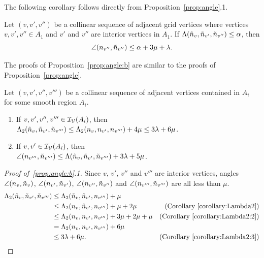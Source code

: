 The following corollary follows directly from Proposition~\ref{prop:angle}.1.
\begin{corollary}
Let $(v,v',v'')$ be a collinear sequence of adjacent grid vertices
where vertices $v,v',v'' \in A_1$
and $v'$ and $v''$ are interior vertices in $A_1$.
If $\Lambda(\tilde{n}_v,\tilde{n}_{v'},\tilde{n}_{v''}) \le \alpha$, then
\begin{equation*}
\angle(n_{v''},\tilde{n}_{v''}) \le \alpha + 3 \mu + \lambda.
\end{equation*}
\label{corollary:collinear}
\end{corollary}

The proofs of Proposition~\ref{prop:angle:b} are similar
to the proofs of Proposition~\ref{prop:angle}.

\begin{propAngle:b}
Let $(v, v', v'',v''')$ be a collinear sequence of adjacent vertices
contained in $A_i$ for some smooth region $A_i$.
\begin{enumerate}
\item If $v, v', v'', v''' \in \mathcal{I_V}(A_i)$, then\\
{\centering
$\Lambda_2(\tilde{n}_v, \tilde{n}_{v'}, \tilde{n}_{v'''}) \le 
\Lambda_2(n_v, n_{v'}, n_{v'''}) + 4 \mu \le 3\lambda + 6 \mu$.}
\item If $v, v' \in \mathcal{I_V}(A_i)$, then\\
{\centering
$\angle(n_{v'''},\tilde{n}_{v'''}) 
   \le \Lambda(\tilde{n}_v,\tilde{n}_{v'},\tilde{n}_{v'''}) + 3\lambda+ 5 \mu$.}
\end{enumerate}
\end{propAngle:b}

\begin{proof}[Proof of~\ref{prop:angle:b}.1]

Since $v$, $v'$, $v''$ and $v'''$ are interior vertices,
angles $\angle(n_v,\tilde{n}_v)$, $\angle(n_{v'}, \tilde{n}_{v'})$,
$\angle(n_{v''}, \tilde{n}_{v''})$ and $\angle(n_{v'''},\tilde{n}_{v'''})$
are all less than $\mu$.
\begin{align*}
\Lambda_2(\tilde{n}_v,\tilde{n}_{v'},\tilde{n}_{v'''}) 
  & \le \Lambda_2(\tilde{n}_v, \tilde{n}_{v'}, n_{v'''}) + \mu \\
  & \le \Lambda_2(n_v, \tilde{n}_{v'}, n_{v'''}) + \mu + 2\mu 
    & \mbox{(Corollary~\ref{corollary:Lambda2})} \\
  & \le \Lambda_2(n_v, n_{v'}, n_{v'''}) + 3\mu + 2\mu + \mu 
    & \mbox{(Corollary~\ref{corollary:Lambda2:2})} \\
  & = \Lambda_2(n_v, n_{v'}, n_{v'''}) + 6 \mu \\
  & \le 3\lambda +  6 \mu.  
    & \mbox{(Corollary~\ref{corollary:Lambda2:3})}
\end{align*}

\end{proof}

